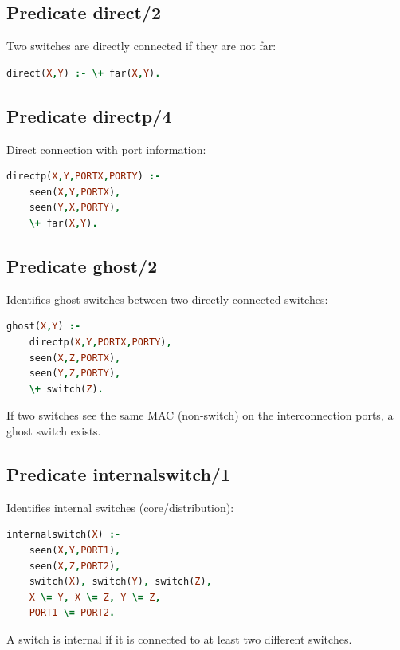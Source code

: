 \documentclass[12pt,a4paper]{article}
\begin{document}
\subsection{Predicate direct/2}

Two switches are directly connected if they are not far:

\begin{lstlisting}[language=Prolog]
direct(X,Y) :- \+ far(X,Y).
\end{lstlisting}

\subsection{Predicate directp/4}

Direct connection with port information:

\begin{lstlisting}[language=Prolog]
directp(X,Y,PORTX,PORTY) :- 
    seen(X,Y,PORTX),
    seen(Y,X,PORTY),
    \+ far(X,Y).
\end{lstlisting}

\subsection{Predicate ghost/2}

Identifies ghost switches between two directly connected switches:

\begin{lstlisting}[language=Prolog]
ghost(X,Y) :- 
    directp(X,Y,PORTX,PORTY),
    seen(X,Z,PORTX),
    seen(Y,Z,PORTY),
    \+ switch(Z).
\end{lstlisting}

If two switches see the same MAC (non-switch) on the interconnection ports, a ghost switch exists.

\subsection{Predicate internalswitch/1}

Identifies internal switches (core/distribution):

\begin{lstlisting}[language=Prolog]
internalswitch(X) :- 
    seen(X,Y,PORT1),
    seen(X,Z,PORT2),
    switch(X), switch(Y), switch(Z), 
    X \= Y, X \= Z, Y \= Z,
    PORT1 \= PORT2.
\end{lstlisting}

A switch is internal if it is connected to at least two different switches.
\end{document}

